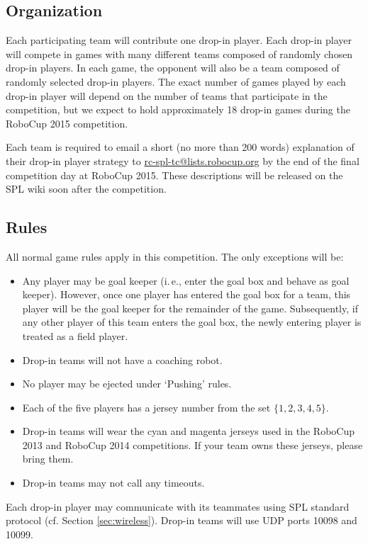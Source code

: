 \documentclass[12pt]{article}
\newcommand{\ie}{\mbox{i.\,e.}\xspace}
\newcommand{\cf}{\mbox{cf.}\xspace}
\begin{document}
\subsection{Organization}

Each participating team will contribute one drop-in player.  Each drop-in player will compete in games with many different teams composed of randomly chosen drop-in players.  In each game, the opponent will also be a team composed of randomly selected drop-in players.  The exact number of games played by each drop-in player will depend on the number of teams that participate in the competition, but we expect to hold approximately 18 drop-in games during the RoboCup 2015 competition.

Each team is required to email a short (no more than 200 words) explanation of their drop-in player strategy to \url{rc-spl-tc@lists.robocup.org} by the end of the final competition day at RoboCup 2015.  These descriptions will be released on the SPL wiki soon after the competition.

\subsection{Rules}

All normal game rules apply in this competition.  The only exceptions will be:
\begin{itemize}
\item Any player may be goal keeper (\ie, enter the goal box and behave as goal keeper).  However, once one player has entered the goal box for a team, this player will be the goal keeper for the remainder of the game.  Subsequently, if any other player of this team enters the goal box, the newly entering player is treated as a field player.
\item Drop-in teams will not have a coaching robot.
\item No player may be ejected under `Pushing' rules.
\item Each of the five players has a jersey number from the set $\{1, 2, 3, 4, 5\}$.
\item Drop-in teams will wear the cyan and magenta jerseys used in the RoboCup 2013 and RoboCup 2014 competitions.  If your team owns these jerseys, please bring them.
\item Drop-in teams may not call any timeouts.
\end{itemize}

Each drop-in player may communicate with its teammates using SPL standard protocol (\cf Section \ref{sec:wireless}).  Drop-in teams will use UDP ports 10098 and 10099.
\end{document}
